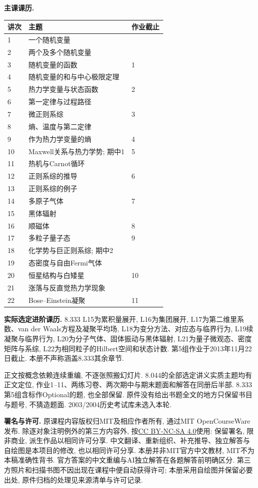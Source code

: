 \noindent\textbf{主课课历.}
\begin{longtable}{@{}p{.08\linewidth}p{.70\linewidth}p{.15\linewidth}@{}}
\toprule 讲次&主题&作业截止\\\midrule\endhead
1&一个随机变量&\\
2&两个及多个随机变量&\\
3&随机变量的函数&1\\
4&随机变量的和与中心极限定理&\\
5&热力学变量与状态函数&2\\
6&第一定律与过程路径&\\
7&微正则系综&3\\
8&熵、温度与第二定律&\\
9&作为热力学变量的熵&4\\
10&Maxwell关系与热力学势; 期中1&5\\
11&热机与Carnot循环&\\
12&正则系综的推导&6\\
13&正则系综的例子&\\
14&多原子气体&7\\
15&黑体辐射&\\
16&顺磁体&8\\
17&多粒子量子态&9\\
18&化学势与巨正则系综; 期中2&\\
19&态密度与自由Fermi气体&\\
20&恒星结构与白矮星&10\\
21&涨落与反直觉热力学现象&\\
22&Bose--Einstein凝聚&11\\
\bottomrule
\end{longtable}
\noindent\textbf{实际选定进阶课历.}
8.333 L15为累积量展开, L16为集团展开, L17为第二维里系数、van der Waals方程及凝聚平均场, L18为变分方法、对应态与临界行为, L19续凝聚与临界行为, L20为分子气体、固体振动与黑体辐射, L21为量子微观态、密度矩阵与系综, L22为相同粒子的Hilbert空间和状态计数. 第5组作业于2013年11月22日截止. 本册不声称涵盖8.333其余章节.

正文按概念依赖连续重编, 不逐张照搬幻灯片. 8.044的全部选定讲义实质主题均有正文定位, 作业1--11、两练习卷、两次期中与期末题面和解答在同册后半部. 8.333第5组含标作Optional的题, 也全部保留. 原件没有给出书题全文的地方只保留书目与题号, 不猜造题面. 2003/2004历史考试库未选入本轮.

\noindent\textbf{署名与许可.}
原课程内容版权归MIT及相应作者所有, 通过MIT OpenCourseWare发布. 除逐对象注明例外的第三方内容外, 按\href{https://creativecommons.org/licenses/by-nc-sa/4.0/}{CC BY-NC-SA 4.0}使用: 保留署名, 限非商业, 派生作品以相同许可分享. 中文翻译、重新组织、补充推导、独立解答与自绘图是本项目的修改, 也以相同许可分享. 本册并非MIT官方中文教材, MIT不为本稿准确性背书. 官方答案的中文重编与AI独立解答在各题解答前明确区分. 第三方照片和扫描书图不因出现在课程中便自动获得许可; 本册采用自绘图并保留必要出处, 原件归档的处理见来源清单与许可记录.
